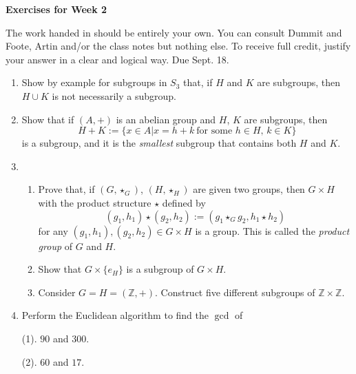 \documentclass[12pt]{article}
\title{}
\date{}
\theoremstyle{plain}
\theoremstyle{definition}
\theoremstyle{remark}
\begin{document}
\begin{center}
{\Large \bf Exercises for Week 2}
\end{center}
The work handed in should be entirely your own. You can consult Dummit and Foote, Artin and/or the class notes but nothing else. To receive full credit, justify your answer in a clear and logical way. Due Sept. 18.

\begin{enumerate}
\item Show by example for subgroups in $S_3$ that, if $H$ and $K$ are subgroups, then $H\cup K$ is not necessarily a subgroup.

\item Show that if $(A,+)$ is an abelian group and $H$, $K$ are subgroups, then 
$$H+K:=\{x\in A|x=h+k~ \textrm{for some $h\in H$, $k\in K$}\}$$ is a subgroup, and it is the \emph{smallest} subgroup that contains both $H$ and $K$.

\item 
\begin{enumerate}
\item Prove that, if $(G,\star_G)$, $(H,\star_H)$ are given two groups, then $G\times H$ with the product structure $\star$ defined by
$$(g_1,h_1)\star (g_2,h_2):=(g_1\star_G g_2, h_1 \star h_2)$$
for any $(g_1,h_1),(g_2,h_2)\in G\times H$ is a group. This is called the \emph{product group} of $G$ and $H$. 
\item Show that $G\times \{e_H\}$ is a subgroup of $G\times H$.
\item Consider $G=H=(\mathbb{Z},+)$. Construct five different subgroups of $\mathbb{Z}\times \mathbb{Z}$.
\end{enumerate}

\item Perform the Euclidean algorithm to find the $\gcd$ of

(1). $90$ and $300$.

(2). $60$ and $17$.


\end{enumerate}
\end{document}
